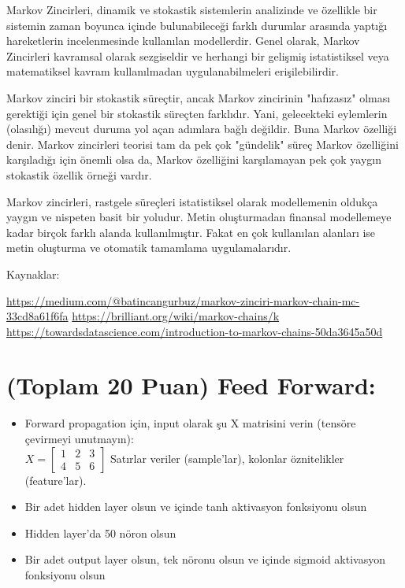 \documentclass[11pt]{article}
\begin{document}
Markov Zincirleri, dinamik ve stokastik sistemlerin analizinde ve özellikle bir sistemin zaman boyunca içinde bulunabileceği farklı durumlar arasında yaptığı hareketlerin incelenmesinde kullanılan modellerdir. Genel olarak, Markov Zincirleri kavramsal olarak sezgiseldir ve herhangi bir gelişmiş istatistiksel veya matematiksel kavram kullanılmadan uygulanabilmeleri erişilebilirdir.

Markov zinciri bir stokastik süreçtir, ancak Markov zincirinin "hafızasız" olması gerektiği için genel bir stokastik süreçten farklıdır. Yani, gelecekteki eylemlerin (olasılığı) mevcut duruma yol açan adımlara bağlı değildir. Buna Markov özelliği denir. Markov zincirleri teorisi tam da pek çok "gündelik" süreç Markov özelliğini karşıladığı için önemli olsa da, Markov özelliğini karşılamayan pek çok yaygın stokastik özellik örneği vardır.

Markov zincirleri, rastgele süreçleri istatistiksel olarak modellemenin oldukça yaygın ve nispeten basit bir yoludur. Metin oluşturmadan finansal modellemeye kadar birçok farklı alanda kullanılmıştır. Fakat en çok kullanılan alanları ise metin oluşturma ve otomatik tamamlama uygulamalarıdır.


   Kaynaklar: 

    \url{https://medium.com/@batincangurbuz/markov-zinciri-markov-chain-mc-33cd8a61f6fa}
    \url{https://brilliant.org/wiki/markov-chains/k}\newline
    \url{https://towardsdatascience.com/introduction-to-markov-chains-50da3645a50d}

\section{(Toplam 20 Puan) Feed Forward:}
 
\begin{itemize}
    \item Forward propagation için, input olarak şu X matrisini verin (tensöre çevirmeyi unutmayın):\\
    $X = \begin{bmatrix}
        1 & 2 & 3\\
        4 & 5 & 6
        \end{bmatrix}$
    Satırlar veriler (sample'lar), kolonlar öznitelikler (feature'lar).
    \item Bir adet hidden layer olsun ve içinde tanh aktivasyon fonksiyonu olsun
    \item Hidden layer'da 50 nöron olsun
    \item Bir adet output layer olsun, tek nöronu olsun ve içinde sigmoid aktivasyon fonksiyonu olsun
\end{itemize}
\end{document}
